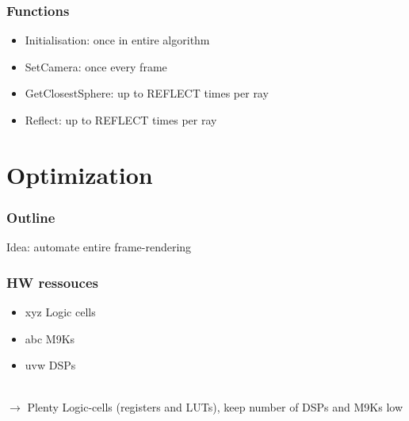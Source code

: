 \documentclass{beamer}
\begin{document}
\begin{frame} %
	\frametitle{Functions} %
  	\begin{itemize}
		\item Initialisation: once in entire algorithm
		\item SetCamera: once every frame
		\item GetClosestSphere: up to REFLECT times per ray
		\item Reflect: up to REFLECT times per ray
	\end{itemize}
\end{frame}



\section{Optimization}
\begin{frame} %
	\frametitle{Outline}
	Idea: automate entire frame-rendering
\end{frame}

\begin{frame} %
	\frametitle{HW ressouces} %
	\begin{itemize}
		\item xyz Logic cells
		\item abc M9Ks
		\item uvw DSPs
	\end{itemize}
	$\quad$\\
	$\rightarrow$ Plenty Logic-cells (registers and LUTs), keep number of DSPs and M9Ks low
\end{frame}
\end{document}
